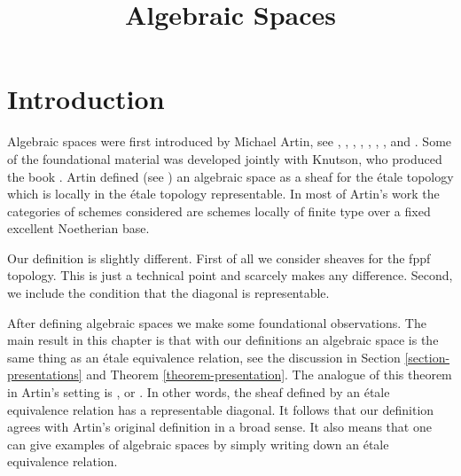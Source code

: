

%


\title{Algebraic Spaces}


\maketitle

\label{section-phantom}

\tableofcontents

\section{Introduction}
\label{section-introduction}

\noindent
Algebraic spaces were first introduced by Michael Artin,
see \cite{ArtinI}, \cite{ArtinII},
\cite{Artin-Theorem-Representability},
\cite{Artin-Construction-Techniques},
\cite{Artin-Algebraic-Spaces},
\cite{Artin-Algebraic-Approximation},
\cite{Artin-Implicit-Function},
and \cite{ArtinVersal}.
Some of the foundational material was developed jointly with
Knutson, who produced the book \cite{Kn}.
Artin defined (see \cite[Definition 1.3]{Artin-Implicit-Function})
an algebraic space as a sheaf for the \'etale topology
which is locally in the \'etale topology representable.
In most of Artin's work the categories of schemes
considered are schemes locally of finite type over a fixed
excellent Noetherian base.

\medskip\noindent
Our definition is slightly different. First of all we consider sheaves
for the fppf topology. This is just a technical point and scarcely makes
any difference. Second, we include the condition that the diagonal is
representable.

\medskip\noindent
After defining algebraic spaces we make some foundational observations.
The main result in this chapter is that with our definitions
an algebraic space is the same thing as an \'etale equivalence relation,
see the discussion in Section \ref{section-presentations} and
Theorem \ref{theorem-presentation}. The analogue of this theorem in
Artin's setting is \cite[Theorem 1.5]{Artin-Implicit-Function}, or
\cite[Proposition II.1.7]{Kn}. In other words, the sheaf
defined by an \'etale equivalence relation has a representable diagonal.
It follows that our definition agrees with Artin's original definition
in a broad sense. It also means that one can give examples of algebraic
spaces by simply writing down an \'etale equivalence relation.


